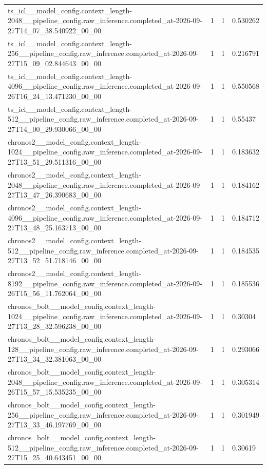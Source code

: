 \begin{tabular}{llll}
ts\_icl\_\_model\_config.context\_length-2048\_\_pipeline\_config.raw\_inference.completed\_at-2026-09-27T14\_07\_38.540922\_00\_00 & 1 & 1 & 0.530262 \\
ts\_icl\_\_model\_config.context\_length-256\_\_pipeline\_config.raw\_inference.completed\_at-2026-09-27T15\_09\_02.844643\_00\_00 & 1 & 1 & 0.216791 \\
ts\_icl\_\_model\_config.context\_length-4096\_\_pipeline\_config.raw\_inference.completed\_at-2026-09-26T16\_24\_13.471230\_00\_00 & 1 & 1 & 0.550568 \\
ts\_icl\_\_model\_config.context\_length-512\_\_pipeline\_config.raw\_inference.completed\_at-2026-09-27T14\_00\_29.930066\_00\_00 & 1 & 1 & 0.55437 \\
chronos2\_\_model\_config.context\_length-1024\_\_pipeline\_config.raw\_inference.completed\_at-2026-09-27T13\_51\_29.511316\_00\_00 & 1 & 1 & 0.183632 \\
chronos2\_\_model\_config.context\_length-2048\_\_pipeline\_config.raw\_inference.completed\_at-2026-09-27T13\_47\_26.390683\_00\_00 & 1 & 1 & 0.184162 \\
chronos2\_\_model\_config.context\_length-4096\_\_pipeline\_config.raw\_inference.completed\_at-2026-09-27T13\_48\_25.163713\_00\_00 & 1 & 1 & 0.184712 \\
chronos2\_\_model\_config.context\_length-512\_\_pipeline\_config.raw\_inference.completed\_at-2026-09-27T13\_52\_51.718146\_00\_00 & 1 & 1 & 0.184535 \\
chronos2\_\_model\_config.context\_length-8192\_\_pipeline\_config.raw\_inference.completed\_at-2026-09-26T15\_56\_11.762064\_00\_00 & 1 & 1 & 0.185536 \\
chronos\_bolt\_\_model\_config.context\_length-1024\_\_pipeline\_config.raw\_inference.completed\_at-2026-09-27T13\_28\_32.596238\_00\_00 & 1 & 1 & 0.30304 \\
chronos\_bolt\_\_model\_config.context\_length-128\_\_pipeline\_config.raw\_inference.completed\_at-2026-09-27T13\_34\_32.381063\_00\_00 & 1 & 1 & 0.293066 \\
chronos\_bolt\_\_model\_config.context\_length-2048\_\_pipeline\_config.raw\_inference.completed\_at-2026-09-26T15\_57\_15.535235\_00\_00 & 1 & 1 & 0.305314 \\
chronos\_bolt\_\_model\_config.context\_length-256\_\_pipeline\_config.raw\_inference.completed\_at-2026-09-27T13\_33\_46.197769\_00\_00 & 1 & 1 & 0.301949 \\
chronos\_bolt\_\_model\_config.context\_length-512\_\_pipeline\_config.raw\_inference.completed\_at-2026-09-27T15\_25\_40.643451\_00\_00 & 1 & 1 & 0.30619 \\

\end{tabular}
